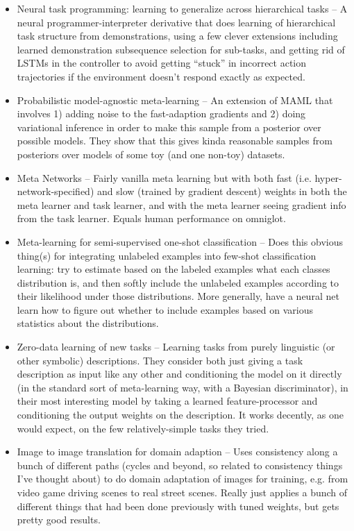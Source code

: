 \documentclass[10pt]{article}
\begin{document}
\begin{itemize}
\item Neural task programming: learning to generalize across hierarchical tasks -- A neural programmer-interpreter derivative that does learning of hierarchical task structure from demonstrations, using a few clever extensions including learned demonstration subsequence selection for sub-tasks, and getting rid of LSTMs in the controller to avoid getting ``stuck'' in incorrect action trajectories if the environment doesn't respond exactly as expected.
\item Probabilistic model-agnostic meta-learning -- An extension of MAML that involves 1) adding noise to the fast-adaption gradients and 2) doing variational inference in order to make this sample from a posterior over possible models. They show that this gives kinda reasonable samples from posteriors over models of some toy (and one non-toy) datasets.  
\item Meta Networks -- Fairly vanilla meta learning but with both fast (i.e. hyper-network-specified) and slow (trained by gradient descent) weights in both the meta learner and task learner, and with the meta learner seeing gradient info from the task learner. Equals human performance on omniglot.
\item Meta-learning for semi-supervised one-shot classification -- Does this obvious thing(s) for integrating unlabeled examples into few-shot classification learning: try to estimate based on the labeled examples what each classes distribution is, and then softly include the unlabeled examples according to their likelihood under those distributions. More generally, have a neural net learn how to figure out whether to include examples based on various statistics about the distributions.
\item Zero-data learning of new tasks -- Learning tasks from purely linguistic (or other symbolic) descriptions. They consider both just giving a task description as input like any other and conditioning the model on it directly (in the standard sort of meta-learning way, with a Bayesian discriminator), in their most interesting model by taking a learned feature-processor and conditioning the output weights on the description. It works decently, as one would expect, on the few relatively-simple tasks they tried. 
\item Image to image translation for domain adaption -- Uses consistency along a bunch of different paths (cycles and beyond, so related to consistency things I've thought about) to do domain adaptation of images for training, e.g. from video game driving scenes to real street scenes. Really just applies a bunch of different things that had been done previously with tuned weights, but gets pretty good results.

\end{itemize}
\end{document}
